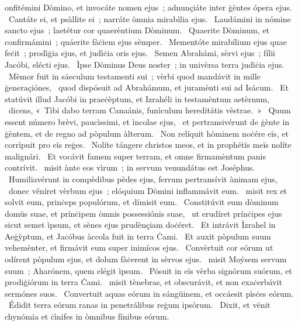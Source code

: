 { }
{%
onfitémini Dòmino, et invocáte nomen ejus~; adnunçiáte inter ġèntes ópera ejus. 
~Cantáte ei, et psàllite ei~; narráte òmnia mirabìlia ejus. 
~Laudámini in nómine sancto ejus~; laetétur cor quaerèntium Dòminum. 
~Quaerite Dòminum, et confirmámini~; quáerite fàċiem ejus sèmper. 
~Mementóte mirabílium ejus quae feċit~; prodìġia ejus, et judìċia oris ejus. 
~Semen Abrahámi, sèrvi ejus~; fílii Jacóbi, elécti ejus. 
~Ìpse Dòminus Deus noster~; in univèrsa terra judìċia ejus. 
~Mèmor fuit in sáeculum testamenti sui~; vèrbi quod mandávit in mille ġeneraçiónes, 
~quod dispósuit ad Abrahámum, et juramènti sui ad Isácum. 
~Et statúvit illud Jacóbi in praeċèptum, et Izrahéli in testamèntum aetèrnum, 
~dicens, «~Tìbi dabo terram Canaánis, funìculum hereditátis vèstrae.~» 
~Quum essent número brèvi, paucìssimi, et ìncolae ejus, 
~et pertransivérunt de ġènte in ġèntem, et de regno ad pòpulum àlterum. 
~Non relíquit hòminem noċére eïs, et corrìpuit pro eïs reġes. 
~Nolíte tángere christos meos, et in prophétïs meïs nolíte malignári. 
~Et vocávit famem super terram, et omne firmamèntum panis contrívit. 
~misit ànte eos vìrum~; in servum venundátus est Joséphus. 
~Humiliavérunt in compèdibus pèdes ejus, ferrum pertransívit ànimam ejus, 
~donec věníret vèrbum ejus~; elóquium Dòmini inflammávit eum. 
~misit rex et solvit eum, prinċeps populórum, et dímisit eum. 
~Constitúvit eum dòminum domüs suae, et prínċipem òmnis possessiónis suae, 
~ut erudíret prínċipes ejus sicut semet ìpsum, et sènes ejus prudènçiam doċéret. 
~Et intrávit Ìzrahel in Aeġỳptum, et Jacóbus àccola fuit in terra Ċami. 
~Et auxit pòpulum suum vehemènter, et firmávit eum super inimícos ejus. 
~Convèrtuit cor eórum ut odírent pòpulum ejus, et dolum fàċerent in sèrvos ejus. 
~misit Moýsem servum suum~; Aharónem, quem elégit ìpsum. 
~Pósuit in eïs vèrba signórum suórum, et prodiġiórum in terra Ċami. 
~misit tènebras, et obscurávit, et non exaċerbávit sermónes suos. 
~Convertuit aquas eórum in sángüinem, et occáesit pìsċes eórum. 
~Édidit terra eórum ranas in penetrálibus reġum ipsórum. 
~Dixit, et vënit chynómia et ċìnifes in òmnibus fínibus eórum. 
}
